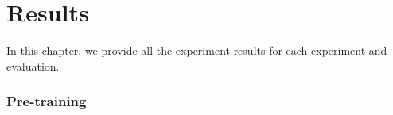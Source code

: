 \chapter{Results}
In this chapter, we provide all the experiment results for each experiment and evaluation.

\subsection{Pre-training}

